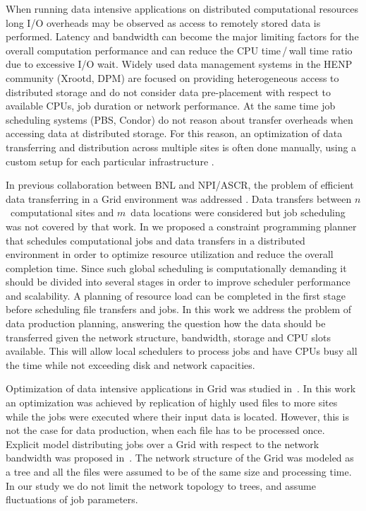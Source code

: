 \documentclass{svjour3}                     %
\begin{document}
When running data intensive applications on distributed computational
resources long I/O overheads may be observed as access to remotely stored data
is performed. Latency and bandwidth can become the major limiting factors for
the overall computation performance and can reduce the CPU time\,/\,wall time 
ratio due to excessive I/O wait. 
Widely used data management systems in the HENP community
(Xrootd, DPM) are focused on providing heterogeneous access to distributed
storage and do not consider data pre-placement with respect to available CPUs,
job duration or network performance. At the same time job scheduling systems
(PBS, Condor) do not reason about transfer overheads when accessing data at
distributed storage. For this reason, an optimization of data transferring and
distribution across multiple sites is often done manually, using a custom
setup for each particular infrastructure \cite{Balewski}. 

In previous collaboration between BNL and NPI/ASCR, the problem of
efficient data transferring in a Grid environment was addressed \cite{Zerola}.
Data transfers between $n$~computational sites and $m$~data locations were
considered but job scheduling was not covered
by that work. In \cite{ACAT_cp} we
proposed a constraint programming planner that schedules computational jobs
and data transfers in a distributed environment in order to optimize resource
utilization and reduce the overall completion time. Since such global
scheduling is computationally demanding it should be divided into several
stages in order to improve scheduler performance and scalability. A planning of
resource load can be completed in the first stage before scheduling file
transfers and jobs. In this work we address the problem of data production
planning, answering the question how the data should be transferred given the
network structure, bandwidth, storage and CPU slots available. This will allow
local schedulers to process jobs and have CPUs busy all the time while not
exceeding disk and network capacities.

Optimization of data intensive applications in Grid was studied
in~\cite{Globus_scheduler}. In this work an optimization was achieved by
replication of highly used files to more sites while the jobs were executed
where their input data is located. However, this is not the case for data
production, when each file has to be processed once. 
%
Explicit model distributing jobs over a Grid with respect to the network
bandwidth was proposed in~\cite{Trees}. The network structure of the Grid was
modeled as a tree and all the files were assumed to be of the same size and
processing time. In our study we do not limit the network topology to trees,
and assume fluctuations of job parameters. 
\end{document}
